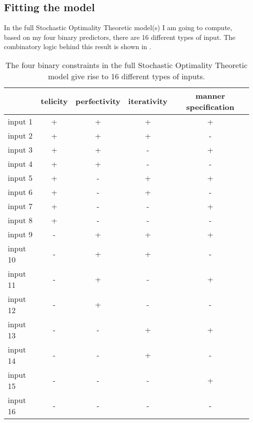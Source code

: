 \subsection{Fitting the model} 

In the full Stochastic Optimality Theoretic model(s) I am going to compute, based on my four binary predictors, there are 16 different types of input. The combinatory logic behind this result is shown in .

\begin{table}[htb] %
\caption{The four binary constraints in the full Stochastic Optimality Theoretic model give rise to 16 different types of inputs.}
\begin{tabular}{l|cccc}
         & telicity & perfectivity & iterativity & manner specification \\
         \hline
input 1  & +       & +           & +          & +                   \\
input 2  & +       & +           & +          & -                   \\
input 3  & +       & +           & -          & +                   \\
input 4  & +       & +           & -          & -                   \\
input 5  & +       & -           & +          & +                   \\
input 6  & +       & -           & +          & -                   \\
input 7  & +       & -           & -          & +                   \\
input 8  & +       & -           & -          & -                   \\
input 9  & -       & +           & +          & +                   \\
input 10 & -       & +           & +          & -                   \\
input 11 & -       & +           & -          & +                   \\
input 12 & -       & +           & -          & -                   \\
input 13 & -       & -           & +          & +                   \\
input 14 & -       & -           & +          & -                   \\
input 15 & -       & -           & -          & +                   \\
input 16 & -       & -           & -          & -           
\end{tabular}
\end{table}

